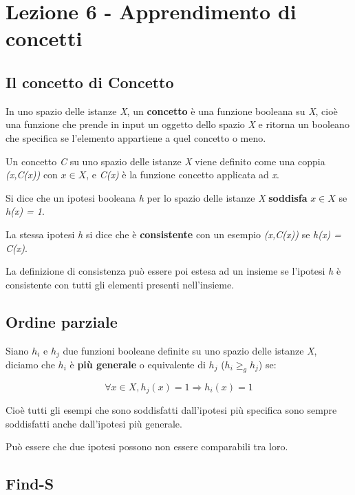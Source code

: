 \section{Lezione 6 - Apprendimento di concetti}\label{lezione-6---apprendimento-di-concetti}

\subsection{Il concetto di Concetto}\label{il-concetto-di-concetto}

In uno spazio delle istanze \emph{X}, un \textbf{concetto} è una
funzione booleana su \emph{X}, cioè una funzione che prende in input un
oggetto dello spazio \emph{X} e ritorna un booleano che specifica se
l'elemento appartiene a quel concetto o meno.

Un concetto \emph{C} su uno spazio delle istanze \emph{X} viene definito
come una coppia \emph{(x,C(x))} con $x \in X$, e \emph{C(x)} è la
funzione concetto applicata ad \emph{x}.

Si dice che un ipotesi booleana \emph{h} per lo spazio delle istanze
\emph{X} \textbf{soddisfa} $x \in X$ se \emph{h(x) = 1}.

La stessa ipotesi \emph{h} si dice che è \textbf{consistente} con un
esempio \emph{(x,C(x))} se \emph{h(x) = C(x)}.

La definizione di consistenza può essere poi estesa ad un insieme se
l'ipotesi \emph{h} è consistente con tutti gli elementi presenti
nell'insieme.

\subsection{Ordine parziale}\label{ordine-parziale}

Siano $h_i$ e $h_j$ due funzioni booleane definite su uno spazio
delle istanze \emph{X}, diciamo che $h_i$ è \textbf{più generale} o
equivalente di $h_j$ ($h_i \geq_g h_j$) se:

$$
\forall x \in X,  h_j(x) = 1 \Rightarrow h_i(x) = 1
$$

Cioè tutti gli esempi che sono soddisfatti dall'ipotesi più specifica
sono sempre soddisfatti anche dall'ipotesi più generale.

Può essere che due ipotesi possono non essere comparabili tra loro.

\subsection{Find-S}\label{find-s}

